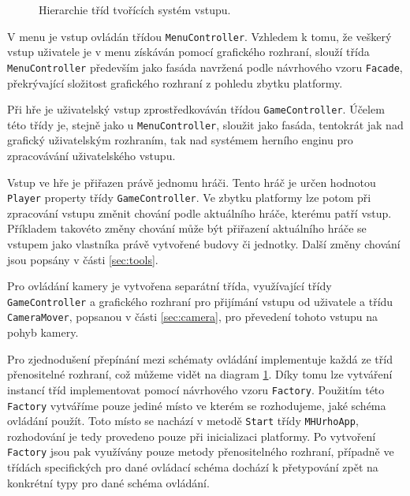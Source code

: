\begin{figure}[h]
	\centering
	\fontsize{7pt}{10pt}\selectfont
	\def\svgwidth{\textwidth}
	
	\caption{Hierarchie tříd tvořících systém vstupu.}
	\label{fig:inputhier}
\end{figure}


V menu je vstup ovládán třídou \texttt{MenuController}. Vzhledem k tomu, že veškerý vstup uživatele je v menu získáván pomocí grafického rozhraní, slouží třída \texttt{MenuController} především jako fasáda navržená podle návrhového vzoru \texttt{Facade}, překrývající složitost grafického rozhraní z pohledu zbytku platformy. 

Při hře je uživatelský vstup zprostředkováván třídou \texttt{GameController}. Účelem této třídy je, stejně jako u \texttt{MenuController}, sloužit jako fasáda, tentokrát jak nad grafický uživatelským rozhraním, tak nad systémem herního enginu pro zpracovávání uživatelského vstupu. 

Vstup ve hře je přiřazen právě jednomu hráči. Tento hráč je určen hodnotou \texttt{Player} property třídy \texttt{GameController}. Ve zbytku platformy lze potom při zpracování vstupu změnit chování podle aktuálního hráče, kterému patří vstup. Příkladem takovéto změny chování může být přiřazení aktuálního hráče se vstupem jako vlastníka právě vytvořené budovy či jednotky. Další změny chování jsou popsány v části \ref{sec:tools}.

Pro ovládání kamery je vytvořena separátní třída, využívající třídy \texttt{GameController} a grafického rozhraní pro přijímání vstupu od uživatele a třídu \texttt{CameraMover},  popsanou v části \ref{sec:camera}, pro převedení tohoto vstupu na pohyb kamery.

Pro zjednodušení přepínání mezi schématy ovládání implementuje každá ze tříd přenositelné rozhraní, což můžeme vidět na diagram \ref{fig:inputhier}. Díky tomu lze vytváření instancí tříd implementovat pomocí návrhového vzoru \texttt{Factory}. Použitím této \texttt{Factory} vytváříme pouze jediné místo ve kterém se rozhodujeme, jaké schéma ovládání použít. Toto místo se nachází v metodě \texttt{Start} třídy \texttt{MHUrhoApp}, rozhodování je tedy provedeno pouze při inicializaci platformy. Po vytvoření \texttt{Factory} jsou pak využívány pouze metody přenositelného rozhraní, případně ve třídách specifických pro dané ovládací schéma dochází k přetypování zpět na konkrétní typy pro dané schéma ovládání.


